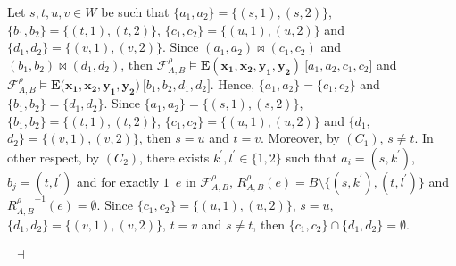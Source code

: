 \documentclass[draft]{article}
\newenvironment{proof}{{\bf Proof:}}{~$\dashv$\\}
\begin{document}
\begin{proof}
%
%
Let $s,t,u,v{\in}W$ be such that $\{a_{1},a_{2}\}{=}\{(s,1),(s,2)\}$, $\{b_{1},b_{2}\}{=}\{(t,1),(t,2)\}$, $\{c_{1},c_{2}\}{=}\{(u,1),(u,2)\}$ and $\{d_{1},d_{2}\}{=}\{(v,1),(v,2)\}$.
Since $(a_{1},a_{2}){\bowtie}(c_{1},c_{2})$ and $(b_{1},b_{2}){\bowtie}(d_{1},d_{2})$, then ${\mathcal F}^{\rho}_{A,B}{\models}\mathbf{E}(\mathbf{x_{1}},\mathbf{x_{2}},\mathbf{y_{1}},\mathbf{y_{2}})\ \lbrack a_{1},a_{2},c_{1},c_{2}\rbrack$ and ${\mathcal F}^{\rho}_{A,B}{\models}\mathbf{E}(\mathbf{x_{1}},
%
%
%
%
%
%
%
%
%
%
%
%
$\linebreak$
%
%
%
%
%
%
%
%
%
%
%
%
\mathbf{x_{2}},\mathbf{y_{1}},\mathbf{y_{2}})\ \lbrack b_{1},b_{2},d_{1},d_{2}\rbrack$.
Hence, %
$\{a_{1},a_{2}\}{=}\{c_{1},c_{2}\}$ and $\{b_{1},b_{2}\}{=}\{d_{1},d_{2}\}$.
Since $\{a_{1},a_{2}\}{=}\{(s,1),(s,2)\}$, $\{b_{1},b_{2}\}{=}\{(t,1),(t,2)\}$, $\{c_{1},c_{2}\}{=}\{(u,1),(u,2)\}$ and $\{d_{1},
%
%
%
%
%
%
%
%
%
%
%
%
$\linebreak$
%
%
%
%
%
%
%
%
%
%
%
%
d_{2}\}{=}\{(v,1),(v,2)\}$, then $s{=}u$ and $t{=}v$.
Moreover, by $(C_{1})$, $s{\not=}t$.
In other respect, by $(C_{2})$, there exists $k^{\prime},l^{\prime}{\in}\{1,2\}$ such that $a_{i}{=}(s,k^{\prime})$, $b_{j}{=}(t,l^{\prime})$ and for exactly $1$~$e$ in ${\mathcal F}_{A,B}^{\rho}$, $R_{A,B}^{\rho}(e){=}B{\setminus}\{(s,k^{\prime}),(t,l^{\prime})\}$ and ${R_{A,B}^{\rho}}^{{-}1}(e){=}\emptyset$.
Since $\{c_{1},c_{2}\}{=}\{(u,1),(u,2)\}$, $s{=}u$, $\{d_{1},d_{2}\}{=}\{(v,1),(v,2)\}$, $t{=}v$ and $s{\not=}t$, then $\{c_{1},
%
%
%
%
%
%
%
%
%
%
%
%
$\linebreak$
%
%
%
%
%
%
%
%
%
%
%
%
c_{2}\}{\cap}\{d_{1},d_{2}\}{=}\emptyset$.

\end{proof}
\end{document}
